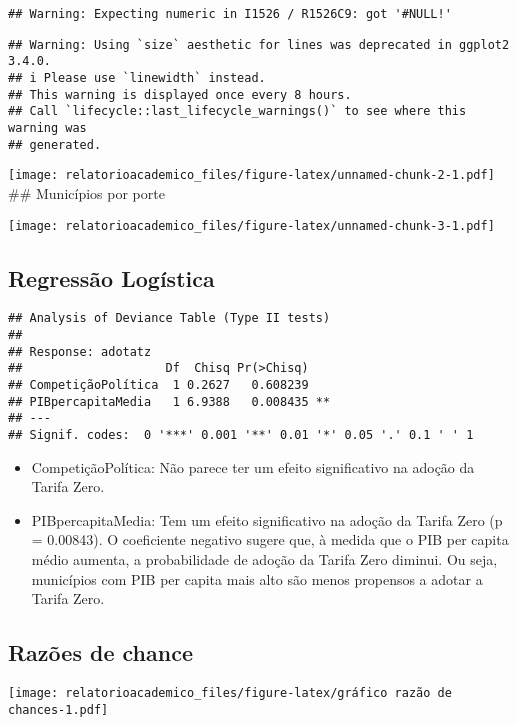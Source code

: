\documentclass[
]{article}
\providecommand{\tightlist}{%
  \setlength{\itemsep}{0pt}\setlength{\parskip}{0pt}}
\begin{document}
\begin{verbatim}
## Warning: Expecting numeric in I1526 / R1526C9: got '#NULL!'
\end{verbatim}

\begin{verbatim}
## Warning: Using `size` aesthetic for lines was deprecated in ggplot2 3.4.0.
## i Please use `linewidth` instead.
## This warning is displayed once every 8 hours.
## Call `lifecycle::last_lifecycle_warnings()` to see where this warning was
## generated.
\end{verbatim}

\texttt{[image: relatorioacademico\_files/figure-latex/unnamed-chunk-2-1.pdf]}
\#\# Municípios por porte

\texttt{[image: relatorioacademico\_files/figure-latex/unnamed-chunk-3-1.pdf]}

\subsection{Regressão Logística}\label{regressuxe3o-loguxedstica}

\begin{verbatim}
## Analysis of Deviance Table (Type II tests)
## 
## Response: adotatz
##                    Df  Chisq Pr(>Chisq)   
## CompetiçãoPolítica  1 0.2627   0.608239   
## PIBpercapitaMedia   1 6.9388   0.008435 **
## ---
## Signif. codes:  0 '***' 0.001 '**' 0.01 '*' 0.05 '.' 0.1 ' ' 1
\end{verbatim}

\begin{itemize}
\tightlist
\item
  CompetiçãoPolítica: Não parece ter um efeito significativo na adoção
  da Tarifa Zero.
\item
  PIBpercapitaMedia: Tem um efeito significativo na adoção da Tarifa
  Zero (p = 0.00843). O coeficiente negativo sugere que, à medida que o
  PIB per capita médio aumenta, a probabilidade de adoção da Tarifa Zero
  diminui. Ou seja, municípios com PIB per capita mais alto são menos
  propensos a adotar a Tarifa Zero.
\end{itemize}

\subsection{Razões de chance}\label{razuxf5es-de-chance}

\texttt{[image: relatorioacademico\_files/figure-latex/gráfico razão de chances-1.pdf]}
\end{document}
